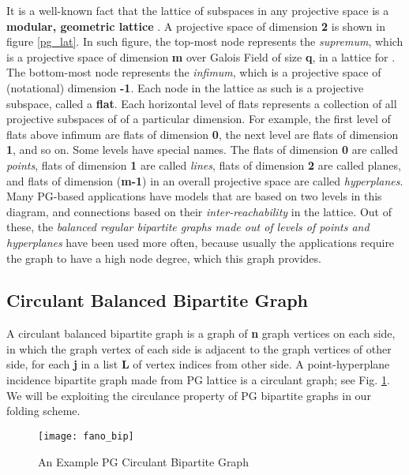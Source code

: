 \documentclass[12pt]{article}
\begin{document}
It is a well-known fact that the lattice of subspaces in any projective
space is a \textbf{modular, geometric lattice} \cite{dam_pap}. A projective
space of dimension {\normalsize \textbf{2}} is shown in figure
\ref{pg_lat}. In such figure, the top-most node represents the
\textit{supremum}, which is a projective space of dimension {\normalsize
\textbf{m}} over Galois Field of size \textbf{q}, in a lattice for
{\normalsize }. The
bottom-most node represents the \textit{infimum}, which is a projective
space of (notational) dimension {\normalsize \textbf{-1}}. Each node in the
lattice as such is a projective subspace, called a \textbf{flat}. Each
horizontal level of flats represents a collection of all projective
subspaces of {\normalsize }
of a particular dimension. For example, the first level of flats above
infimum are flats of dimension {\normalsize \textbf{0}}, the next level are
flats of dimension {\normalsize \textbf{1}}, and so on. Some levels have
special names. The flats of dimension {\normalsize \textbf{0}} are called
\textit{points}, flats of dimension {\normalsize \textbf{1}} are called
\textit{lines}, flats of dimension {\normalsize \textbf{2}} are called
planes, and flats of dimension {\normalsize (\textbf{m-1})} in an overall
projective space {\normalsize
} are called
\textit{hyperplanes}. Many PG-based applications have models that are based
on two levels in this diagram, and connections based on their
\textit{inter-reachability} in the lattice. Out of these, the
\textit{balanced regular bipartite graphs made out of levels of points and
hyperplanes} have been used more often, because usually the applications
require the graph to have a high node degree, which this graph provides.

\subsection{Circulant Balanced Bipartite Graph}
A circulant balanced bipartite graph is a graph of {\normalsize \textbf{n}}
graph vertices on each side, in which the {\normalsize }
graph vertex of each side is adjacent to the {\normalsize
} graph vertices of other side, for
each {\normalsize \textbf{j}} in a list \textbf{L} of vertex indices from
other side. A point-hyperplane incidence bipartite graph made from PG
lattice is a circulant graph; see Fig. \ref{pg_bbg}. We will be exploiting the circulance property
of PG bipartite graphs in our folding scheme.

\begin{figure}[h]
\begin{center}
\texttt{[image: fano\_bip]}
\end{center}
\caption{An Example PG Circulant Bipartite Graph}
\label{pg_bbg}
\end{figure}
\end{document}
